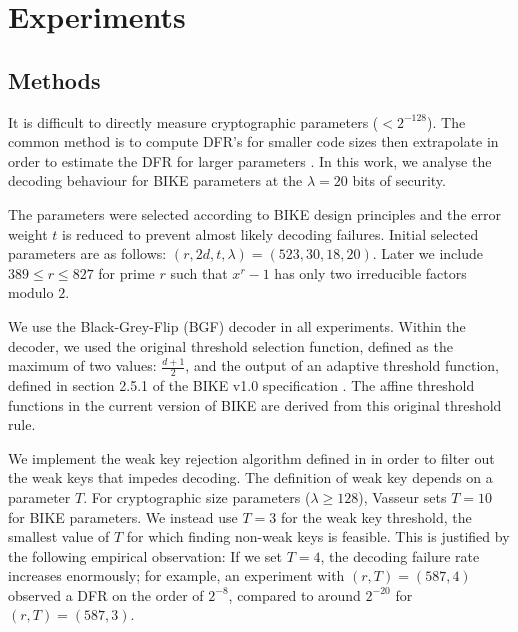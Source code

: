 \chapter{Experiments}

\section{Methods}

It is difficult to directly measure cryptographic parameters ($< 2^{-128}$). The common method is to compute DFR's for smaller code sizes then extrapolate in order to estimate the DFR for larger parameters \cite{SV19,DGK20a,DGK20b}. In this work, we analyse the decoding behaviour for BIKE parameters at the $\lambda = 20$ bits of security. 

The parameters were selected according to BIKE design principles and the error weight $t$ is reduced to prevent almost likely decoding failures. Initial selected parameters are as follows: $(r,2d,t,\lambda) = (523,30,18,20)$. Later we include $389 \le r \le 827$ for prime $r$ such that $x^r - 1$ has only two irreducible factors modulo $2$.

We use the Black-Grey-Flip (BGF) decoder in all experiments. Within the decoder, we used the original threshold selection function, defined as the maximum of two values: $\frac{d+1}{2}$, and the output of an adaptive threshold function, defined in section 2.5.1 of the BIKE v1.0 specification \cite{BIKE2017}. The affine threshold functions in the current version of BIKE are derived from this original threshold rule.

We implement the weak key rejection algorithm defined in \cite[Algorithm 15.3]{Vasseur-thesis} in order to filter out the weak keys that impedes decoding. The definition of weak key depends on a parameter $T$. For cryptographic size parameters ($\lambda \geq 128$), Vasseur sets $T=10$ for BIKE parameters. We instead use $T = 3$ for the weak key threshold, the smallest value of $T$ for which finding non-weak keys is feasible. This is justified by the following empirical observation: If we set $T = 4$, the decoding failure rate increases enormously; for example, an experiment with $(r, T) = (587, 4)$ observed a DFR on the order of $2^{-8}$, compared to around $2^{-20}$ for $(r, T) = (587, 3)$.


